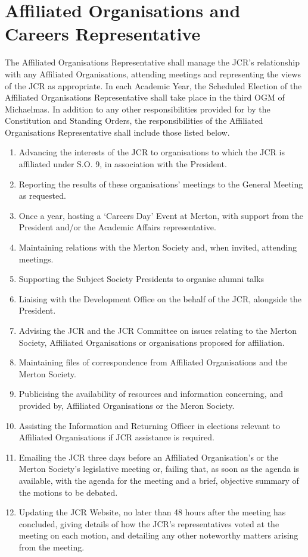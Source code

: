 \section{Affiliated Organisations and Careers Representative}
\npara The Affiliated Organisations Representative shall manage the JCR's relationship with any Affiliated Organisations, attending meetings and representing the views of the JCR as appropriate.
\npara In each Academic Year, the Scheduled Election of the Affiliated Organisations Representative shall take place in the third OGM of Michaelmas.
\npara In addition to any other responsibilities provided for by the Constitution and Standing Orders, the responsibilities of the Affiliated Organisations Representative shall include those listed below.
\begin{enumerate}
	\item Advancing the interests of the JCR to organisations to which the JCR is affiliated under S.O. 9, in association with the President.     
	\item Reporting the results of these organisations' meetings to the General Meeting as requested.
	\item Once a year, hosting a `Careers Day' Event at Merton, with support from the President and/or the Academic Affairs representative.
	\item Maintaining relations with the Merton Society and, when invited, attending meetings.
	\item Supporting the Subject Society Presidents to organise alumni talks
	\item Liaising with the Development Office on the behalf of the JCR, alongside the President.
	\item Advising the JCR and the JCR Committee on issues relating to the Merton Society, Affiliated Organisations or organisations proposed for affiliation.
	\item Maintaining files of correspondence from Affiliated Organisations and the Merton Society.
	\item Publicising the availability of resources and information concerning, and provided by, Affiliated Organisations or the Meron Society.
	\item Assisting the Information and Returning Officer in elections relevant to Affiliated Organisations if JCR assistance is required.
	\item Emailing the JCR three days before an Affiliated Organisation's or the Merton Society's legislative meeting or, failing that, as soon as the agenda is available, with the agenda for the meeting and a brief, objective summary of the motions to be debated.
	\item Updating the JCR Website, no later than 48 hours after the meeting has concluded, giving details of how the JCR's representatives voted at the meeting on each motion, and detailing any other noteworthy matters arising from the meeting.
\end{enumerate}
